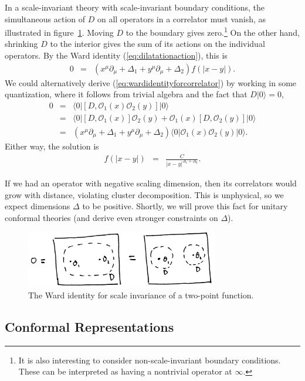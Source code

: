 \documentclass{ws-rv9x6}
\newcommand\be{\begin{eqnarray}}
\newcommand\ee{\end{eqnarray}}
\newcommand\cO{\mathcal{O}}
\newcommand\p[1]{\left(#1\right)}
\newcommand\ptl\partial
\newcommand\<\langle
\renewcommand\>\rangle
\newcommand\nn{\nonumber}
\renewcommand\.{\cdot}
\newcommand\De{\Delta}
\newcommand\oo\infty
\begin{document}
In a scale-invariant theory with scale-invariant boundary conditions, the simultaneous action of $D$ on all operators in a correlator must vanish, as illustrated in figure~\ref{fig:wardidentityford}.  Moving $D$ to the boundary gives zero.\footnote{It is also interesting to consider non-scale-invariant boundary conditions. These can be interpreted as having a nontrivial operator at $\oo$.}  On the other hand, shrinking $D$ to the interior gives the sum of its actions on the individual operators.  By the Ward identity (\ref{eq:dilatationaction}), this is
\be
\label{eq:wardidentityforcorrelator}
0 &=& \p{x^\mu\ptl_\mu + \Delta_1+y^\mu\ptl_\mu+\Delta_2}f(|x-y|).
\ee
We could alternatively derive (\ref{eq:wardidentityforcorrelator}) by working in some quantization, where it follows from trivial algebra and the fact that $D|0\> = 0$,
\be
0 &=& \<0|[D,\cO_1(x)\cO_2(y)]|0\>\nn\\
&=& \<0|[D,\cO_1(x)]\cO_2(y)+\cO_1(x)[D,\cO_2(y)]|0\>\nn\\
&=& \p{x^\mu\ptl_\mu + \Delta_1+y^\mu\ptl_\mu+\Delta_2}\<0|\cO_1(x)\cO_2(y)|0\>.
\ee
Either way, the solution is
\be
f(|x-y|) &=& \frac{C}{|x-y|^{\Delta_1+\Delta_2}}.
\ee


If we had an operator with negative scaling dimension, then its correlators would grow with distance, violating cluster decomposition. This is unphysical, so we expect dimensions $\De$ to be positive. Shortly, we will prove this fact for unitary conformal theories (and derive even stronger constraints on $\De$).

\begin{figure}
\begin{center}
\includegraphics[width=0.75\textwidth]{wardidentityford.jpg}
\end{center}
\caption{The Ward identity for scale invariance of a two-point function. \label{fig:wardidentityford}}
\end{figure}


\subsection{Conformal Representations}
\end{document}
